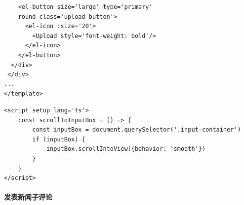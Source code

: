 \begin{itemize}
\begin{verbatim}
    <el-button size='large' type='primary' 
    round class='upload-button'>
      <el-icon :size='20'>
        <Upload style='font-weight: bold'/>
      </el-icon>
    </el-button>
  </div>
 </div>
...
</template>
	\end{verbatim}
	
	\begin{verbatim}
<script setup lang='ts'>
	const scrollToInputBox = () => {
		const inputBox = document.querySelector('.input-container')
		if (inputBox) {
			inputBox.scrollIntoView({behavior: 'smooth'})
		}
	}
</script>
	\end{verbatim}
\end{itemize}

\paragraph{发表新闻子评论}
